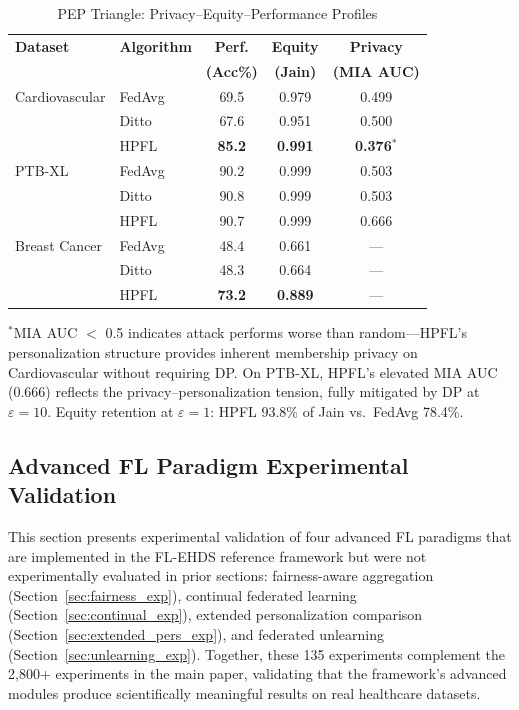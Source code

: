 \documentclass[conference]{IEEEtran}
\begin{document}
\begin{table}[htbp]
\centering
\caption{PEP Triangle: Privacy--Equity--Performance Profiles}
\label{tab:pep_triangle}
\small
\begin{tabular}{llccc}
\toprule
\textbf{Dataset} & \textbf{Algorithm} & \textbf{Perf.} & \textbf{Equity} & \textbf{Privacy} \\
 & & \textbf{(Acc\%)} & \textbf{(Jain)} & \textbf{(MIA AUC)} \\
\midrule
Cardiovascular & FedAvg & 69.5 & 0.979 & 0.499 \\
 & Ditto & 67.6 & 0.951 & 0.500 \\
 & HPFL & \textbf{85.2} & \textbf{0.991} & \textbf{0.376}$^*$ \\
\midrule
PTB-XL & FedAvg & 90.2 & 0.999 & 0.503 \\
 & Ditto & 90.8 & 0.999 & 0.503 \\
 & HPFL & 90.7 & 0.999 & 0.666 \\
\midrule
Breast Cancer & FedAvg & 48.4 & 0.661 & --- \\
 & Ditto & 48.3 & 0.664 & --- \\
 & HPFL & \textbf{73.2} & \textbf{0.889} & --- \\
\bottomrule
\end{tabular}

\vspace{1mm}
\footnotesize{$^*$MIA AUC $<$ 0.5 indicates attack performs worse than random---HPFL's personalization structure provides inherent membership privacy on Cardiovascular without requiring DP. On PTB-XL, HPFL's elevated MIA AUC (0.666) reflects the privacy--personalization tension, fully mitigated by DP at $\varepsilon{=}10$. Equity retention at $\varepsilon{=}1$: HPFL 93.8\% of Jain vs.\ FedAvg 78.4\%.}
\end{table}


\subsection{Advanced FL Paradigm Experimental Validation}
\label{sec:cascade4}

This section presents experimental validation of four advanced FL paradigms that are implemented in the FL-EHDS reference framework but were not experimentally evaluated in prior sections: fairness-aware aggregation (Section~\ref{sec:fairness_exp}), continual federated learning (Section~\ref{sec:continual_exp}), extended personalization comparison (Section~\ref{sec:extended_pers_exp}), and federated unlearning (Section~\ref{sec:unlearning_exp}). Together, these 135 experiments complement the 2,800+ experiments in the main paper, validating that the framework's advanced modules produce scientifically meaningful results on real healthcare datasets.
\end{document}
